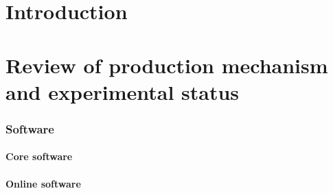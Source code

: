 \documentclass[12pt,a4paper]{report}
\begin{document}
\renewcommand{\thefootnote}{\fnsymbol{footnote}}
\setcounter{footnote}{1}



\renewcommand{\thefootnote}{\arabic{footnote}}
\setcounter{footnote}{0}




\setcounter{page}{1}

\linenumbers

% 



\chapter{Introduction}

\chapter{Review of production mechanism and experimental status}



\subsection{Software}
\subsubsection{Core software}
\subsubsection{Online software}
\end{document}
